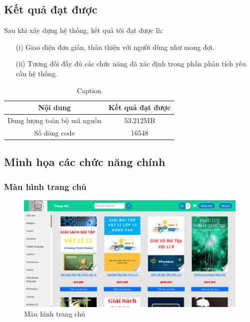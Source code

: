 \documentclass[../DoAn.tex]{subfiles}
\begin{document}
\subsection{Kết quả đạt được}

Sau khi xây dựng hệ thống, kết quả tôi đạt được là:
\begin{enumerate}
    \item[(i)] Giao diện đơn giản, thân thiện với người dùng như mong đợi.
    \item[(ii)] Tương đối đầy đủ các chức năng đã xác định trong phần phân tích yêu cầu hệ thống.
\end{enumerate}

\begin{table}[H]
    \centering
    \begin{tabular}{|c|c|}
        \hline
        \textbf{Nội dung} & \textbf{Kết quả đạt được} \\ \hline
        Dung lượng toàn bộ mã nguồn &  53.212MB \\ \hline
        Số dòng code & 16548 \\ \hline
        \hline
    \end{tabular}
    \caption{Caption}
    \label{tab:my_label}
\end{table}

\subsection{Minh họa các chức năng chính}

\subsubsection{Màn hình trang chủ}
\begin{figure}[H]
    \centering
    \includegraphics[width=1\linewidth]{Hinhve/màn hình trang chủ.png}
    \caption{Màn hình trang chủ}
    \label{fig:visual home}
\end{figure}
\end{document}
